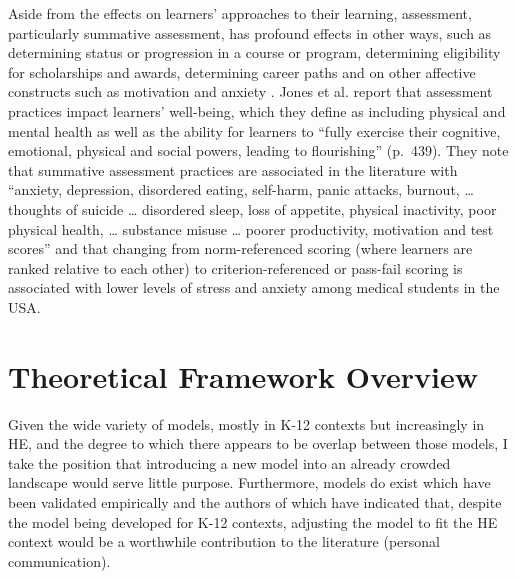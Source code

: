 \documentclass[
]{book}
\begin{document}
Aside from the effects on learners' approaches to their learning, assessment, particularly summative assessment, has profound effects in other ways, such as determining status or progression in a course or program, determining eligibility for scholarships and awards, determining career paths and on other affective constructs such as motivation \citep{crooksImpactClassroomEvaluation1988} and anxiety \citep{birenbaumAssessmentInstructionPreferences2007, harlenSystematicReviewImpact2002}. Jones et al. \citeyearpar{jonesStudentWellbeingAssessment2021} report that assessment practices impact learners' well-being, which they define as including physical and mental health as well as the ability for learners to ``fully exercise their cognitive, emotional, physical and social powers, leading to flourishing'' (p.~439). They note that summative assessment practices are associated in the literature with ``anxiety, depression, disordered eating, self-harm, panic attacks, burnout, \ldots{} thoughts of suicide \ldots{} disordered sleep, loss of appetite, physical inactivity, poor physical health, \ldots{} substance misuse \ldots{} poorer productivity, motivation and test scores'' and that changing from norm-referenced scoring (where learners are ranked relative to each other) to criterion-referenced or pass-fail scoring is associated with lower levels of stress and anxiety among medical students in the USA.

\hypertarget{theoretical-framework-overview}{%
\section*{Theoretical Framework Overview}\label{theoretical-framework-overview}}

Given the wide variety of models, mostly in K-12 contexts but increasingly in HE, and the degree to which there appears to be overlap between those models, I take the position that introducing a new model into an already crowded landscape would serve little purpose. Furthermore, models do exist which have been validated empirically \citep{delucaApproachesClassroomAssessment2016} and the authors of which have indicated that, despite the model being developed for K-12 contexts, adjusting the model to fit the HE context would be a worthwhile contribution to the literature (personal communication).
\end{document}
